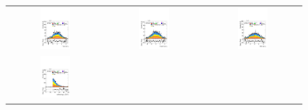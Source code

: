 \begin{figure}[htbp]
  \centering
  \setlength{\tabcolsep}{1.5pt}
  \renewcommand{\arraystretch}{0}

  \begin{tabular}{@{}c c c@{}}
    \includegraphics[width=0.33\textwidth]{images/modelling_tmva_vars/plot_jet_2_eta_hh_tth.pdf} &
    \includegraphics[width=0.33\textwidth]{images/modelling_tmva_vars/plot_jet_3_eta_hh_tth.pdf} &
    \includegraphics[width=0.33\textwidth]{images/modelling_tmva_vars/plot_jet_4_eta_hh_tth.pdf} \\[4pt]
    \includegraphics[width=0.33\textwidth]{images/modelling_tmva_vars/plot_tau_1_pt_hh_tth.pdf} &

\end{tabular}
\end{figure}
